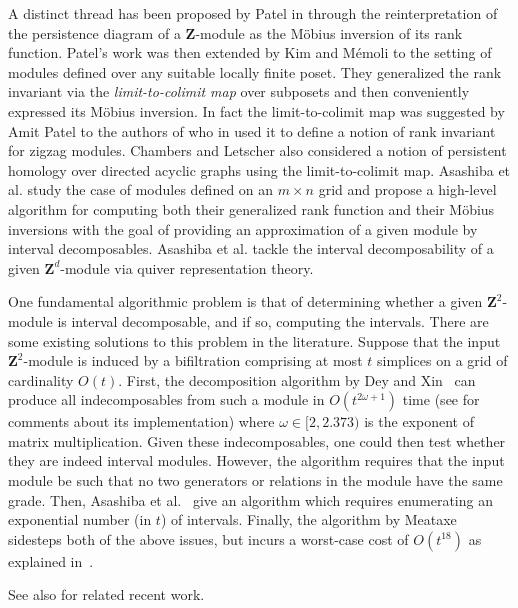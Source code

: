\documentclass[11pt]{article}
\theoremstyle{definition}
\newcommand{\Z}{\mathbf{Z}}
\begin{document}
A distinct thread has been proposed by  Patel in \cite{patel2018generalized} through the reinterpretation of the persistence diagram of a $\Z$-module as the  M\"obius inversion of its rank function. Patel's work was then extended by Kim and M\'emoli \cite{kim2018generalized} to the setting of modules defined over any suitable locally finite poset. They generalized  the rank invariant via the \emph{limit-to-colimit map} over subposets and then conveniently expressed its M\"obius inversion. In fact the limit-to-colimit map was suggested by Amit Patel to the authors of \cite{kim2018generalized} who in \cite{kim2018generalized_v1} used it to define a notion of rank invariant for zigzag modules.  Chambers and Letscher \cite{chambers2018persistent} also  considered a notion of persistent homology over directed acyclic graphs using the limit-to-colimit map. Asashiba et al. \cite{asashiba2019approximation} study  the case of modules defined on an $m\times n$ grid and propose a high-level algorithm for computing both their generalized rank function and their M\"obius inversions with the goal of providing an approximation of a given module by interval decomposables. Asashiba et al.  \cite{asashiba2018interval} tackle the interval decomposability of a given $\Z^d$-module via quiver representation theory.

One fundamental algorithmic problem is that of determining whether a given $\Z^2$-module is interval decomposable, and if so, computing the intervals. 
There are some existing solutions to this problem in the literature.
Suppose that the input $\Z^2$-module is induced by a bifiltration comprising at most $t$ simplices on a grid of cardinality $O(t)$. 
First, the decomposition algorithm by Dey and Xin~\cite{dey2019generalized} can produce all
indecomposables from such a module in $O(t^{2\omega+1})$ time (see \cite{kerber2020multi} for comments about its implementation) where $\omega\in [2,2.373)$ is the exponent of matrix multiplication. Given these indecomposables, one could then test whether they are indeed interval modules. However, the algorithm requires that the input module be such that no two generators or relations
in the module have the same grade. Then, Asashiba et al.~\cite{asashiba2018interval}
give an algorithm which requires
enumerating an exponential number (in $t$) of intervals. Finally,
the algorithm by Meataxe sidesteps both of the above issues, but incurs a worst-case
cost of $O(t^{18})$ as explained in~\cite{dey2019generalized}.

\medskip
See also \cite{betthauser2021graded,botnan2021signed,bubenik2020virtual,kim2021bigraded,mccleary2020edit} for related recent work.
\end{document}
